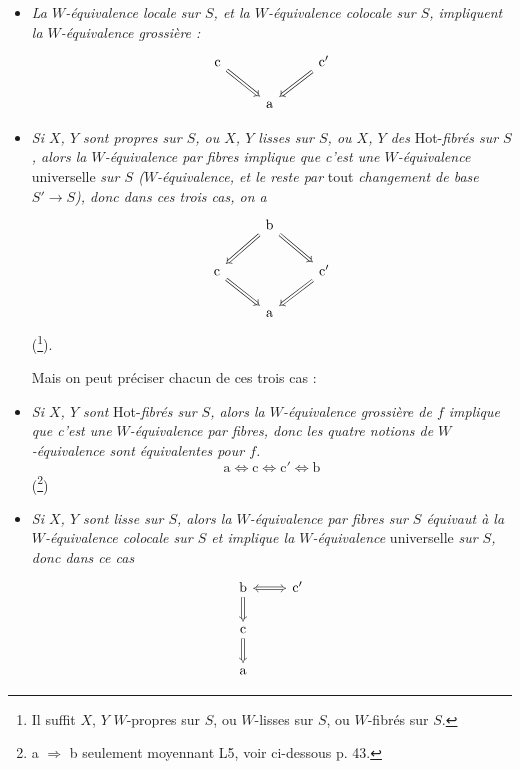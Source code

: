 \begin{itemize}
\item[1)] \textit{La $W$-équivalence locale sur $S$, et la $W$-équivalence colocale sur $S$, impliquent la $W$-équivalence grossière :}
\[
\begin{tikzcd}
\text{c} \arrow[dr, Rightarrow] & & \text{c}' \arrow[dl, Rightarrow] \\
& \text{a} &
\end{tikzcd}
\]


\item[2)] \textit{Si $X$, $Y$ sont propres sur $S$, ou $X$, $Y$ lisses sur $S$, ou $X$, $Y$ des} Hot-\textit{fibrés sur $S$, alors la $W$-équivalence par fibres implique que c'est une $W$-équivalence} universelle \textit{sur $S$ ($W$-équivalence, et le reste par} tout \textit{changement de base $S' \longrightarrow S$), donc dans ces trois cas, on a}
\[
\begin{tikzcd}
& \text{b} \arrow[dl, Rightarrow] \arrow[dr, Rightarrow] & \\
\text{c} \arrow[dr, Rightarrow] & & \text{c}' \arrow[dl, Rightarrow] \\
& \text{a} &
\end{tikzcd}
\]
(\footnote[21]{Il suffit $X$, $Y$ $W$-propres sur $S$, ou $W$-lisses sur $S$, ou $W$-fibrés sur $S$.}).

Mais on peut préciser chacun de ces trois cas :

\item[(2 fib)] \textit{Si $X$, $Y$ sont} Hot-\textit{fibrés sur $S$, alors la $W$-équivalence grossière de $f$ implique que c'est une $W$-équivalence par fibres, donc les quatre notions de $W$-équivalence sont équivalentes pour $f$.}
\[
\text{a} \Longleftrightarrow \text{c} \Longleftrightarrow \text{c}' \Longleftrightarrow \text{b}
\]
(\footnote[22]{a $\Longrightarrow$ b seulement moyennant L5, voir ci-dessous p. 43.})

\item[(2 lisse)] \textit{Si $X$, $Y$ sont lisse sur $S$, alors la $W$-équivalence par fibres sur $S$ équivaut à la $W$-équivalence colocale sur $S$ et implique la $W$-équivalence} universelle \textit{sur $S$, donc dans ce cas} %
\[
\begin{tikzcd}
\text{b} \arrow[r, Leftrightarrow] \arrow[d, Rightarrow] & \text{c}' \\
\text{c} \arrow[d, Rightarrow] & \\
\text{a} &
\end{tikzcd}
\]


\end{itemize}
